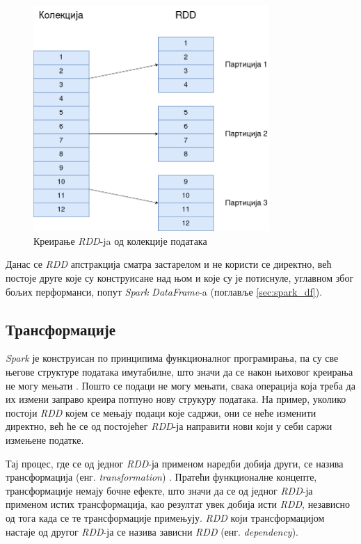\documentclass[12pt,oneside]{memoir}
\begin{document}
\begin{figure}[!ht]
  \centering
  \includegraphics[width=0.80\textwidth]{pictures/spark_rdd_creation.png}
  \caption{Креирање \textit{RDD}-ja од колекције података}
  \label{fig:spark_rdd_creation_png}
\end{figure}

Данас се \textit{RDD} апстракција сматра застарелом и не користи се директно, већ постоје друге које су конструисане над њом и које су је потиснуле, углавном због бољих перформанси, попут \textit{Spark DataFrame}-a (поглавље \ref{sec:spark_df}).

\subsection{Трансформације}
\label{subsec:spark_transf}

\textit{Spark} је конструисан по принципима функционалног програмирања, па су све његове структуре података имутабилне, што значи да се након њиховог креирања не могу мењати \cite{spark_guide}. Пошто се подаци не могу мењати, свака операција која треба да их измени заправо креира потпуно нову струкуру података. На пример, уколико постоји \textit{RDD} којем се мењају подаци које садржи, они се неће изменити директно, већ ће се од постојећег \textit{RDD}-ја направити нови који у себи саржи измењене податке.

Тај процес, где се од једног \textit{RDD}-ја применом наредби добија други, се назива трансформација (енг. \textit{transformation})  \cite{spark_guide}. Пратећи функционалне концепте, трансформације немају бочне ефекте, што значи да се од једног \textit{RDD}-ја применом истих трансформација, као резултат увек добија исти \textit{RDD}, независно од тога када се те трансформације примењују. \textit{RDD} који трансформацијом настаје од другог \textit{RDD}-ја се назива зависни \textit{RDD} (енг. \textit{dependency}).
\end{document}

